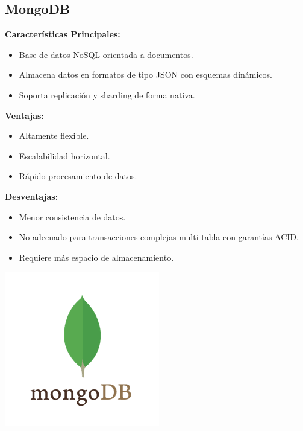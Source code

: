 \documentclass{article}
\begin{document}
\subsection{MongoDB}
\textbf{Características Principales:}
\begin{itemize}
    \item Base de datos NoSQL orientada a documentos.
    \item Almacena datos en formatos de tipo JSON con esquemas dinámicos.
    \item Soporta replicación y sharding de forma nativa.
\end{itemize}
\textbf{Ventajas:}
\begin{itemize}
    \item Altamente flexible.
    \item Escalabilidad horizontal.
    \item Rápido procesamiento de datos.
\end{itemize}
\textbf{Desventajas:}
\begin{itemize}
    \item Menor consistencia de datos.
    \item No adecuado para transacciones complejas multi-tabla con garantías ACID.
    \item Requiere más espacio de almacenamiento.
\end{itemize}
\includegraphics[width=\linewidth]{mongodb.png}
\end{document}
